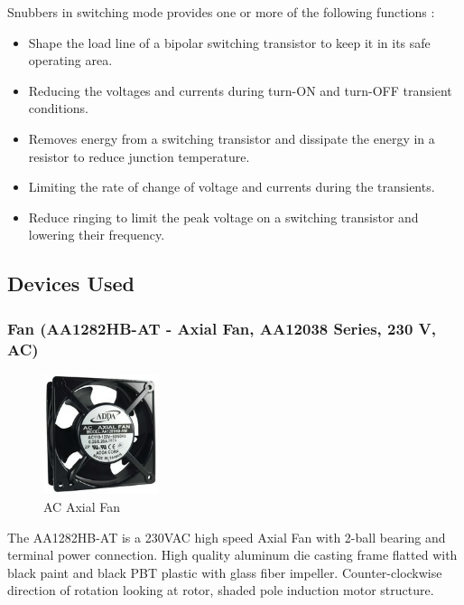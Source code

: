 Snubbers in switching mode provides one or more of the following functions :
\begin{itemize}
	\item Shape the load line of a bipolar switching transistor to keep it in its safe operating area.
	\item Reducing the voltages and currents during turn-ON and turn-OFF transient conditions.
	\item Removes energy from a switching transistor and dissipate the energy in a resistor to reduce junction temperature.
	\item Limiting the rate of change of voltage and currents during the transients.
	\item Reduce ringing to limit the peak voltage on a switching transistor and lowering their frequency.
\end{itemize}

\subsection{Devices Used}
\subsubsection*{Fan (AA1282HB-AT - Axial Fan, AA12038 Series, 230 V, AC)}

\begin{figure}
	\includegraphics[width=0.3\textwidth]{photos/theory/aa1282hb.jpg}
	\caption{AC Axial Fan}
\end{figure}

The AA1282HB-AT is a 230VAC high speed Axial Fan with 2-ball bearing and terminal power connection. High quality aluminum die casting frame flatted with black paint and black PBT plastic with glass fiber impeller. Counter-clockwise direction of rotation looking at rotor, shaded pole induction motor structure.

